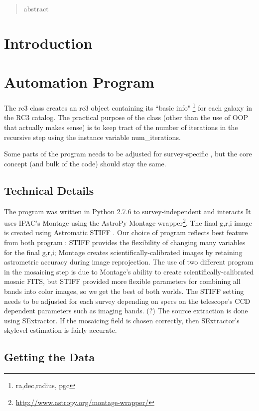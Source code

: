 \documentclass[5p]{elsarticle}
\begin{document}
\begin{abstract}
abstract
\end{abstract}


\section{Introduction}
\section{Automation Program}
	The rc3 class creates an rc3 object containing its ``basic info" \footnote{ ra,dec,radius, pgc} for each galaxy in the RC3 catalog. The practical purpose of the class (other than the use of OOP that actually makes sense) is to keep tract of the number of iterations in the recursive step using the instance variable num\_iterations. 
	
	Some parts of the program needs to be adjusted for survey-specific , but the core concept (and bulk of the code) should stay the same. 

		\subsection{Technical Details}
	The program was written in Python 2.7.6 to survey-independent and interacts 
 It uses IPAC's Montage  \cite{montage} using the AstroPy Montage wrapper\footnote{\url{http://www.astropy.org/montage-wrapper/}}. The final g,r,i image is created using Astromatic STIFF \cite{stiff} . Our choice of program reflects best feature from both program : STIFF provides the flexibility of changing many variables for the final g,r,i; Montage creates scientifically-calibrated images by retaining astrometric accuracy during image reprojection. The use of two different program in the mosaicing step is due to Montage's ability to create scientifically-calibrated mosaic FITS, but STIFF provided more flexible parameters for combining all bands into color images, so we get the best of both worlds. The STIFF setting needs to be adjusted for each survey depending on specs on the telescope's CCD dependent parameters such as imaging bands. (?) The source extraction is done using SExtractor. If the mosaicing field is chosen correctly, then SExtractor's skylevel estimation is fairly accurate.
	\subsection{Getting the Data}
\end{document}
